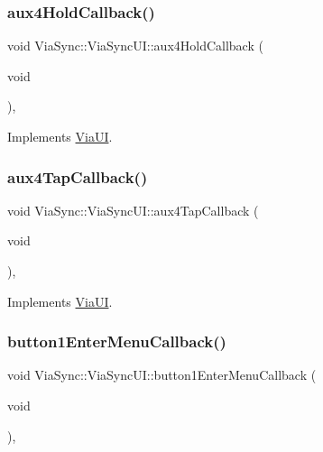 \subsubsection{\texorpdfstring{aux4\+Hold\+Callback()}{aux4HoldCallback()}}
{\footnotesize\ttfamily void Via\+Sync\+::\+Via\+Sync\+U\+I\+::aux4\+Hold\+Callback (\begin{DoxyParamCaption}\item[{void}]{ }\end{DoxyParamCaption})\hspace{0.3cm}{\ttfamily [override]}, {\ttfamily [virtual]}}



Implements \mbox{\hyperlink{class_via_u_i_a884790ab6dac8e6f49104146ff620512}{Via\+UI}}.

\mbox{\label{class_via_sync_1_1_via_sync_u_i_a1cf7ef02457d9f7887da0721799aadc0}} 
\subsubsection{\texorpdfstring{aux4\+Tap\+Callback()}{aux4TapCallback()}}
{\footnotesize\ttfamily void Via\+Sync\+::\+Via\+Sync\+U\+I\+::aux4\+Tap\+Callback (\begin{DoxyParamCaption}\item[{void}]{ }\end{DoxyParamCaption})\hspace{0.3cm}{\ttfamily [override]}, {\ttfamily [virtual]}}



Implements \mbox{\hyperlink{class_via_u_i_a0a43c527f027d11b266080d8cacb1d65}{Via\+UI}}.

\mbox{\label{class_via_sync_1_1_via_sync_u_i_a2082d2d4a5ef8cbbaa2a1d8a387b3cad}} 
\subsubsection{\texorpdfstring{button1\+Enter\+Menu\+Callback()}{button1EnterMenuCallback()}}
{\footnotesize\ttfamily void Via\+Sync\+::\+Via\+Sync\+U\+I\+::button1\+Enter\+Menu\+Callback (\begin{DoxyParamCaption}\item[{void}]{ }\end{DoxyParamCaption})\hspace{0.3cm}{\ttfamily [override]}, {\ttfamily [virtual]}}



